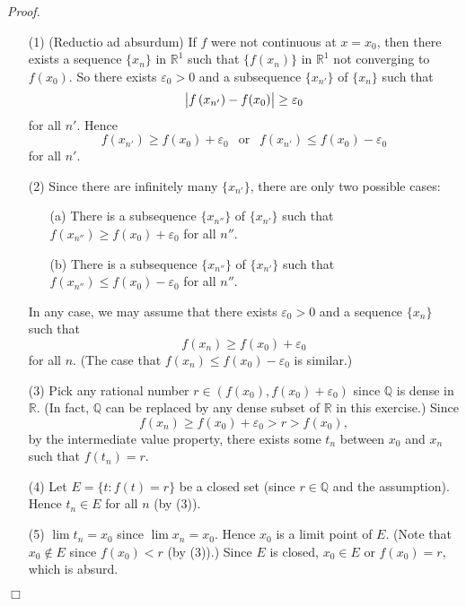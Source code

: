 \documentclass{article}
\begin{document}
\emph{Proof.}
\begin{enumerate}
\item[(1)]
(Reductio ad absurdum)
If $f$ were not continuous at $x = x_0$, then there exists a sequence $\{x_n\}$ in $\mathbb{R}^1$
such that $\{f(x_n)\}$ in $\mathbb{R}^1$ not converging to $f(x_0)$.
So there exists $\varepsilon_0 > 0$ and a subsequence $\{x_{n'}\}$ of $\{x_n\}$
such that
\[
  \abs{ f\left(x_{n'}\right) - f(x_0) } \geq \varepsilon_0
\]
for all $n'$.
Hence
\[
  f\left(x_{n'}\right) \geq f(x_0) + \varepsilon_0
  \:\: \text{ or } \:\:
  f\left(x_{n'}\right) \leq f(x_0) - \varepsilon_0
\]
for all $n'$.

\item[(2)]
Since there are infinitely many $\{x_{n'}\}$,
there are only two possible cases:
  \begin{enumerate}
  \item[(a)]
  There is a subsequence $\{x_{n''}\}$ of $\{x_{n'}\}$
  such that
  $f\left(x_{n''}\right) \geq f(x_0) + \varepsilon_0$
  for all $n''$.

  \item[(b)]
  There is a subsequence $\{x_{n''}\}$ of $\{x_{n'}\}$
  such that
  $f\left(x_{n''}\right) \leq f(x_0) - \varepsilon_0$
  for all $n''$.
  \end{enumerate}
In any case, we may assume that there exists $\varepsilon_0 > 0$
and a sequence $\{x_n\}$
such that
\[
  f(x_{n}) \geq f(x_0) + \varepsilon_0
\]
for all $n$.
(The case that $f(x_{n}) \leq f(x_0) - \varepsilon_0$ is similar.)

\item[(3)]
Pick any rational number $r \in (f(x_0), f(x_0) + \varepsilon_0)$
since $\mathbb{Q}$ is dense in $\mathbb{R}$.
(In fact, $\mathbb{Q}$ can be replaced by any dense subset of $\mathbb{R}$ in this exercise.)
Since
\[
  f(x_n) \geq f(x_0) + \varepsilon_0 > r > f(x_0),
\]
by the intermediate value property,
there exists some $t_n$ between $x_0$ and $x_n$
such that $f(t_n) = r$.

\item[(4)]
Let $E = \{ t : f(t) = r \}$ be a closed set
(since $r \in \mathbb{Q}$ and the assumption).
Hence $t_n \in E$ for all $n$ (by (3)).

\item[(5)]
$\lim t_n = x_0$ since $\lim x_n = x_0$.
Hence $x_0$ is a limit point of $E$.
(Note that $x_0 \not\in E$ since $f(x_0) < r$ (by (3)).)
Since $E$ is closed, $x_0 \in E$ or $f(x_0) = r$, which is absurd.
\end{enumerate}
$\Box$ \\
\end{document}
